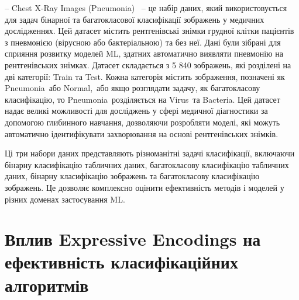 -- Chest X-Ray Images (Pneumonia)~\cite{ct32} -- це набір даних, який використовується для задач бінарної та багатокласової класифікації зображень у медичних дослідженнях. Цей датасет містить рентгенівські знімки грудної клітки пацієнтів з пневмонією (вірусною або бактеріальною) та без неї. Дані були зібрані для сприяння розвитку моделей ML, здатних автоматично виявляти пневмонію на рентгенівських знімках. Датасет складається з 5 840 зображень, які розділені на дві категорії: Train та Test. Кожна категорія містить зображення, позначені як \glqq Pneumonia\grqq\ або \glqq Normal,\grqq\ або якщо розглядати задачу, як багатокласову класифікацію, то \glqq Pneumonia\grqq\ розділяється на \glqq Virus\grqq\ та \glqq Bacteria\grqq. Цей датасет надає великі можливості для досліджень у сфері медичної діагностики за допомогою глибинного навчання, дозволяючи розробляти моделі, які можуть автоматично ідентифікувати захворювання на основі рентгенівських знімків.

Ці три набори даних представляють різноманітні задачі класифікації, включаючи бінарну класифікацію табличних даних, багатокласову класифікацію табличних даних, бінарну класифікацію зображень та багатокласову класифікацію зображень. Це дозволяє комплексно оцінити ефективність методів і моделей у різних доменах застосування ML.

\section{Вплив Expressive Encodings на ефективність класифікаційних алгоритмів}

